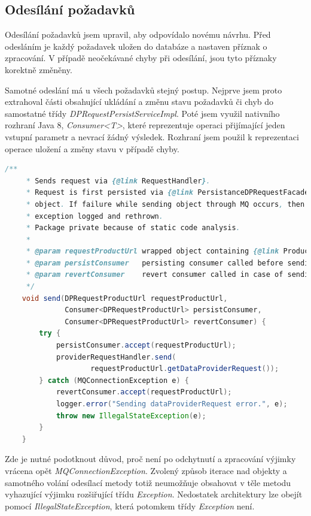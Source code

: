 \documentclass[thesis=B,czech]{FITthesis}[2012/06/26]
\begin{document}
\subsection{Odesílání požadavků}
Odesílání požadavků jsem upravil, aby odpovídalo novému návrhu. Před odesláním je každý požadavek uložen do databáze a nastaven
příznak o zpracování. V případě neočekávané chyby při odesílání, jsou tyto příznaky korektně změněny.
\par
Samotné odeslání má u všech požadavků stejný postup. Nejprve jsem proto extrahoval části obsahující ukládání a změnu stavu požadavků či chyb do samostatné třídy
\textit{DPRequestPersistServiceImpl}. Poté jsem využil nativního rozhraní Java 8, \textit{Consumer<T>}, které reprezentuje
operaci přijímající jeden vstupní parametr a nevrací žádný výsledek. Rozhraní jsem použil k reprezentaci operace uložení a
změny stavu v případě chyby.

\begin{lstlisting}[language=Java, caption={Společná metoda zajišťující odeslání DataProvider požadavků.}]
    /**
     * Sends request via {@link RequestHandler}.
     * Request is first persisted via {@link PersistanceDPRequestFacade} and it's id is set to the request in wrapper
     * object. If failure while sending object through MQ occurs, then {@link Consumer} failureHandler is called,
     * exception logged and rethrown.
     * Package private because of static code analysis.
     *
     * @param requestProductUrl wrapped object containing {@link ProductUrl} and {@link DataProviderRequest}
     * @param persistConsumer   persisting consumer called before sending
     * @param revertConsumer    revert consumer called in case of sending failure
     */
    void send(DPRequestProductUrl requestProductUrl,
              Consumer<DPRequestProductUrl> persistConsumer,
              Consumer<DPRequestProductUrl> revertConsumer) {
        try {
            persistConsumer.accept(requestProductUrl);
            providerRequestHandler.send(
                    requestProductUrl.getDataProviderRequest());
        } catch (MQConnectionException e) {
            revertConsumer.accept(requestProductUrl);
            logger.error("Sending dataProviderRequest error.", e);
            throw new IllegalStateException(e);
        }
    }
\end{lstlisting}

Zde je nutné podotknout důvod, proč není po odchytnutí a zpracování výjimky vrácena opět \textit{MQConnectionException}. 
Zvolený způsob iterace nad objekty a samotného volání odesílací metody totiž neumožňuje obsahovat v těle metodu
vyhazující výjimku rozšiřující třídu \textit{Exception}.
Nedostatek architektury lze obejít pomocí \textit{IllegalStateException}, která potomkem třídy \textit{Exception} není.
\end{document}
